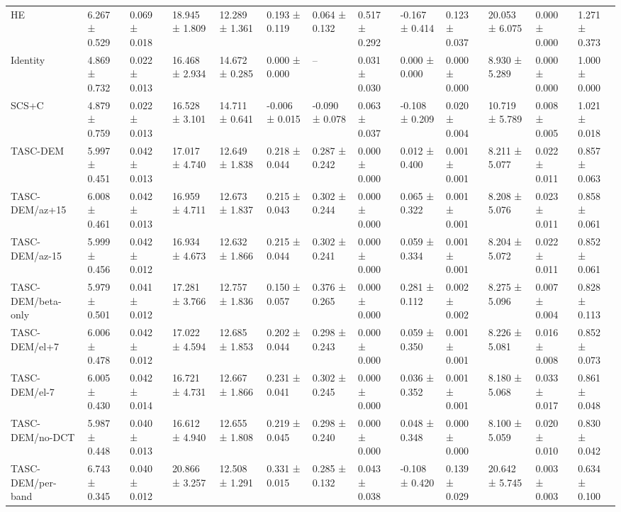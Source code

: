 \begin{table}[t]
\begin{tabular}{lllllllllllll}
HE & 6.267 ± 0.529 & 0.069 ± 0.018 & 18.945 ± 1.809 & 12.289 ± 1.361 & 0.193 ± 0.119 & 0.064 ± 0.132 & 0.517 ± 0.292 & -0.167 ± 0.414 & 0.123 ± 0.037 & 20.053 ± 6.075 & 0.000 ± 0.000 & 1.271 ± 0.373 \\
Identity & 4.869 ± 0.732 & 0.022 ± 0.013 & 16.468 ± 2.934 & 14.672 ± 0.285 & 0.000 ± 0.000 & -- & 0.031 ± 0.030 & 0.000 ± 0.000 & 0.000 ± 0.000 & 8.930 ± 5.289 & 0.000 ± 0.000 & 1.000 ± 0.000 \\
SCS+C & 4.879 ± 0.759 & 0.022 ± 0.013 & 16.528 ± 3.101 & 14.711 ± 0.641 & -0.006 ± 0.015 & -0.090 ± 0.078 & 0.063 ± 0.037 & -0.108 ± 0.209 & 0.020 ± 0.004 & 10.719 ± 5.789 & 0.008 ± 0.005 & 1.021 ± 0.018 \\
TASC-DEM & 5.997 ± 0.451 & 0.042 ± 0.013 & 17.017 ± 4.740 & 12.649 ± 1.838 & 0.218 ± 0.044 & 0.287 ± 0.242 & 0.000 ± 0.000 & 0.012 ± 0.400 & 0.001 ± 0.001 & 8.211 ± 5.077 & 0.022 ± 0.011 & 0.857 ± 0.063 \\
TASC-DEM/az+15 & 6.008 ± 0.461 & 0.042 ± 0.013 & 16.959 ± 4.711 & 12.673 ± 1.837 & 0.215 ± 0.043 & 0.302 ± 0.244 & 0.000 ± 0.000 & 0.065 ± 0.322 & 0.001 ± 0.001 & 8.208 ± 5.076 & 0.023 ± 0.011 & 0.858 ± 0.061 \\
TASC-DEM/az-15 & 5.999 ± 0.456 & 0.042 ± 0.012 & 16.934 ± 4.673 & 12.632 ± 1.866 & 0.215 ± 0.044 & 0.302 ± 0.241 & 0.000 ± 0.000 & 0.059 ± 0.334 & 0.001 ± 0.001 & 8.204 ± 5.072 & 0.022 ± 0.011 & 0.852 ± 0.061 \\
TASC-DEM/beta-only & 5.979 ± 0.501 & 0.041 ± 0.012 & 17.281 ± 3.766 & 12.757 ± 1.836 & 0.150 ± 0.057 & 0.376 ± 0.265 & 0.000 ± 0.000 & 0.281 ± 0.112 & 0.002 ± 0.002 & 8.275 ± 5.096 & 0.007 ± 0.004 & 0.828 ± 0.113 \\
TASC-DEM/el+7 & 6.006 ± 0.478 & 0.042 ± 0.012 & 17.022 ± 4.594 & 12.685 ± 1.853 & 0.202 ± 0.044 & 0.298 ± 0.243 & 0.000 ± 0.000 & 0.059 ± 0.350 & 0.001 ± 0.001 & 8.226 ± 5.081 & 0.016 ± 0.008 & 0.852 ± 0.073 \\
TASC-DEM/el-7 & 6.005 ± 0.430 & 0.042 ± 0.014 & 16.721 ± 4.731 & 12.667 ± 1.866 & 0.231 ± 0.041 & 0.302 ± 0.245 & 0.000 ± 0.000 & 0.036 ± 0.352 & 0.001 ± 0.001 & 8.180 ± 5.068 & 0.033 ± 0.017 & 0.861 ± 0.048 \\
TASC-DEM/no-DCT & 5.987 ± 0.448 & 0.040 ± 0.013 & 16.612 ± 4.940 & 12.655 ± 1.808 & 0.219 ± 0.045 & 0.298 ± 0.240 & 0.000 ± 0.000 & 0.048 ± 0.348 & 0.000 ± 0.000 & 8.100 ± 5.059 & 0.020 ± 0.010 & 0.830 ± 0.042 \\
TASC-DEM/per-band & 6.743 ± 0.345 & 0.040 ± 0.012 & 20.866 ± 3.257 & 12.508 ± 1.291 & 0.331 ± 0.015 & 0.285 ± 0.132 & 0.043 ± 0.038 & -0.108 ± 0.420 & 0.139 ± 0.029 & 20.642 ± 5.745 & 0.003 ± 0.003 & 0.634 ± 0.100 \\

\end{tabular}
\end{table}
